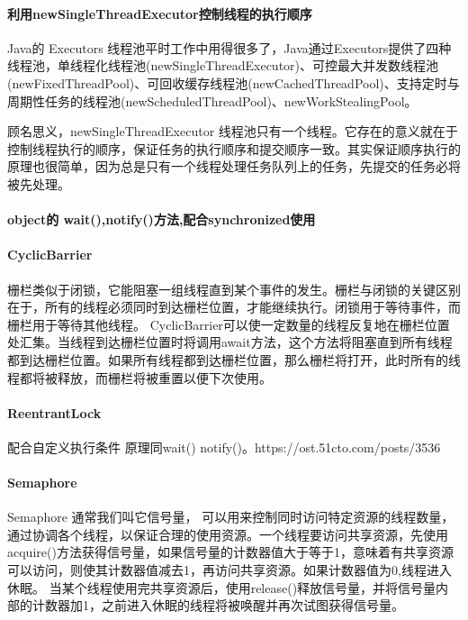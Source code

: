 \documentclass[../../../interview-questions.tex]{subfiles}
\begin{document}
\paragraph{利用newSingleThreadExecutor控制线程的执行顺序}

Java的 Executors 线程池平时工作中用得很多了，Java通过Executors提供了四种线程池，单线程化线程池(newSingleThreadExecutor)、可控最大并发数线程池(newFixedThreadPool)、可回收缓存线程池(newCachedThreadPool)、支持定时与周期性任务的线程池(newScheduledThreadPool)、newWorkStealingPool。

顾名思义，newSingleThreadExecutor 线程池只有一个线程。它存在的意义就在于控制线程执行的顺序，保证任务的执行顺序和提交顺序一致。其实保证顺序执行的原理也很简单，因为总是只有一个线程处理任务队列上的任务，先提交的任务必将被先处理。

\paragraph{object的 wait(),notify()方法,配合synchronized使用}

\paragraph{CyclicBarrier}

栅栏类似于闭锁，它能阻塞一组线程直到某个事件的发生。栅栏与闭锁的关键区别在于，所有的线程必须同时到达栅栏位置，才能继续执行。闭锁用于等待事件，而栅栏用于等待其他线程。 CyclicBarrier可以使一定数量的线程反复地在栅栏位置处汇集。当线程到达栅栏位置时将调用await方法，这个方法将阻塞直到所有线程都到达栅栏位置。如果所有线程都到达栅栏位置，那么栅栏将打开，此时所有的线程都将被释放，而栅栏将被重置以便下次使用。

\paragraph{ReentrantLock}

配合自定义执行条件 原理同wait() notify()。https://ost.51cto.com/posts/3536

\paragraph{Semaphore}

Semaphore 通常我们叫它信号量， 可以用来控制同时访问特定资源的线程数量，通过协调各个线程，以保证合理的使用资源。一个线程要访问共享资源，先使用acquire()方法获得信号量，如果信号量的计数器值大于等于1，意味着有共享资源可以访问，则使其计数器值减去1，再访问共享资源。如果计数器值为0,线程进入休眠。
当某个线程使用完共享资源后，使用release()释放信号量，并将信号量内部的计数器加1，之前进入休眠的线程将被唤醒并再次试图获得信号量。
\end{document}
